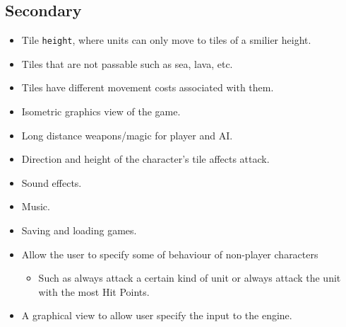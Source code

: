 \subsection{Secondary} \label{secondary}
\begin{itemize}
	\item Tile \texttt{height}, where units can only move to tiles of a smilier height.
	
	\item Tiles that are not passable such as sea, lava, etc.
	
	\item Tiles have different movement costs associated with them.
	
	\item Isometric graphics view of the game.
	
	\item Long distance weapons\slash magic for player and AI.
	
	\item Direction and height of the character's tile affects attack.
	
	\item Sound effects.
	
	\item Music.
	
	\item Saving and loading games.
	
	\item Allow the user to specify some of behaviour of non-player characters
	\begin{itemize}
		\item Such as always attack a certain kind of unit or always attack the unit with the most Hit Points.
	\end{itemize}
	
	\item A graphical view to allow user specify the input to the engine.
\end{itemize}

